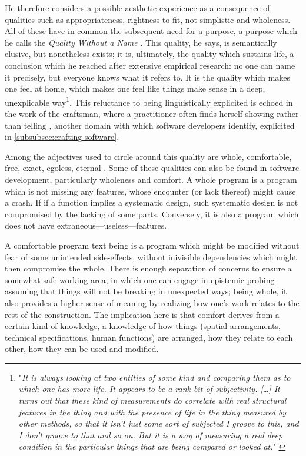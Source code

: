 He therefore considers a possible aesthetic experience as a consequence of qualities such as appropriateness, rightness to fit, not-simplistic and wholeness. All of these have in common the subsequent need for a purpose, a purpose which he calls the \emph{Quality Without a Name} \citep{alexander_timeless_1979}. This quality, he says, is semantically elusive, but nonetheless exists; it is, ultimately, the quality which sustains life, a conclusion which he reached after extensive empirical research: no one can name it precisely, but everyone knows what it refers to. It is the quality which makes one feel at home, which makes one feel like things make sense in a deep, unexplicable way\footnote{"\emph{It is always looking at two entities of some kind and comparing them as to which one has more life. It appears to be a rank bit of subjectivity. [\dots] It turns out that these kind of measurements do correlate with real structural features in the thing and with the presence of life in the thing measured by other methods, so that it isn't just some sort of subjected I groove to this, and I don't groove to that and so on. But it is a way of measuring a real deep condition in the particular things that are being compared or looked at.}" \citep{alexander_keynote_1996}}. This reluctance to being linguistically explicited is echoed in the work of the craftsman, where a practitioner often finds herself showing rather than telling \citep{pye_nature_2008}, another domain with which software developers identify, explicited in \autoref{subsubsec:crafting-software}.

Among the adjectives used to circle around this quality are whole, comfortable, free, exact, egoless, eternal \citep{alexander_timeless_1979}. Some of these qualities can also be found in software development, particularly wholeness and comfort. A whole program is a program which is not missing any features, whose encounter (or lack thereof) might cause a crash. If if a function implies a systematic design, such systematic design is not compromised by the lacking of some parts. Conversely, it is also a program which does not have extraneous—useless—features.

A comfortable program text being is a program which might be modified without fear of some unintended side-effects, without inivisible dependencies which might then compromise the whole. There is enough separation of concerns to ensure a somewhat safe working area, in which one can engage in epistemic probing assuming that things will not be breaking in unexpected ways; being whole, it also provides a higher sense of meaning by realizing how one's work relates to the rest of the construction. The implication here is that comfort derives from a certain kind of knowledge, a knowledge of how things (spatial arrangements, technical specifications, human functions) are arranged, how they relate to each other, how they can be used and modified.

